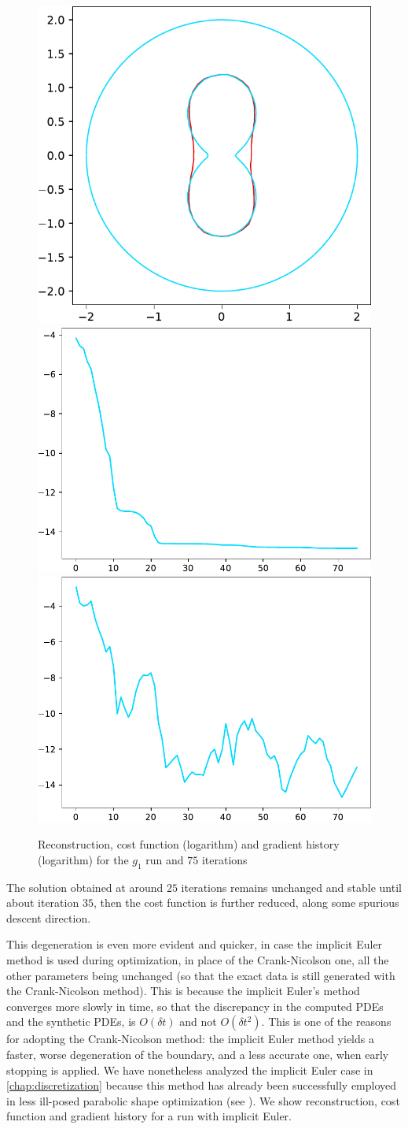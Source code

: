 \documentclass[english,a4paper,9pt,oneside]{scrbook}	%
\theoremstyle{break}
\theoremstyle{remark}
\begin{document}
\begin{figure}[H]
\centering
\includegraphics[height=0.25\columnwidth]{Images/hourglass_constant_degenerate/comparison.pdf}
\includegraphics[height=0.25\columnwidth]{Images/hourglass_constant_degenerate/cost_function.pdf}
\includegraphics[height=0.25\columnwidth]{Images/hourglass_constant_degenerate/gradient_infty_norm.pdf}
\caption{Reconstruction, cost function (logarithm) and gradient history (logarithm) for the $g_1$ run and $75$ iterations}\label{fig:degenerate}
\end{figure}

The solution obtained at around $25$ iterations remains unchanged and stable until about iteration $35$, then the cost function is further reduced, along some spurious descent direction.

This degeneration is even more evident and quicker, in case the implicit Euler method is used during optimization, in place of the Crank-Nicolson one, all the other parameters being unchanged (so that the exact data is still generated with the Crank-Nicolson method). This is because the implicit Euler's method converges more slowly in time, so that the discrepancy in the computed PDEs and the synthetic PDEs, is $O(\delta t)$ and not $O(\delta t^2)$. This is one of the reasons for adopting the Crank-Nicolson method: the implicit Euler method yields a faster, worse degeneration of the boundary, and a less accurate one, when early stopping is applied. We have nonetheless analyzed the implicit Euler case in \cref{chap:discretization} because this method has already been successfully employed in less ill-posed parabolic shape optimization (see \cite{lindemann2}). We show reconstruction, cost function and gradient history for a run with implicit Euler.
\end{document}
